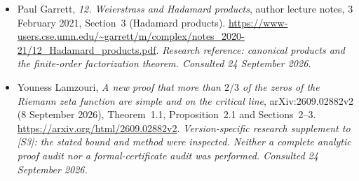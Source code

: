 \documentclass[11pt]{article}
\begin{document}
\begin{itemize}
\item[\textnormal{[E8]}]\hypertarget{extra:statement:8}{} Paul Garrett,
\emph{12. Weierstrass and Hadamard products}, author lecture notes,
3 February 2021, Section~3 (Hadamard products).
\url{https://www-users.cse.umn.edu/~garrett/m/complex/notes_2020-21/12_Hadamard_products.pdf}.
{\small\textit{Research reference: canonical products and the finite-order
factorization theorem. Consulted 24 September 2026.}}

\item[\textnormal{[E9]}]\hypertarget{extra:statement:9}{} Youness Lamzouri,
\emph{A new proof that more than $2/3$ of the zeros of the Riemann zeta
function are simple and on the critical line},
arXiv:2609.02882v2 (8 September 2026), Theorem~1.1,
Proposition~2.1 and Sections~2--3.
\url{https://arxiv.org/html/2609.02882v2}.
{\small\textit{Version-specific research supplement to [S3]: the stated bound
and method were inspected. Neither a complete analytic proof audit nor a
formal-certificate audit was performed. Consulted 24 September 2026.}}
\end{itemize}
\end{document}
